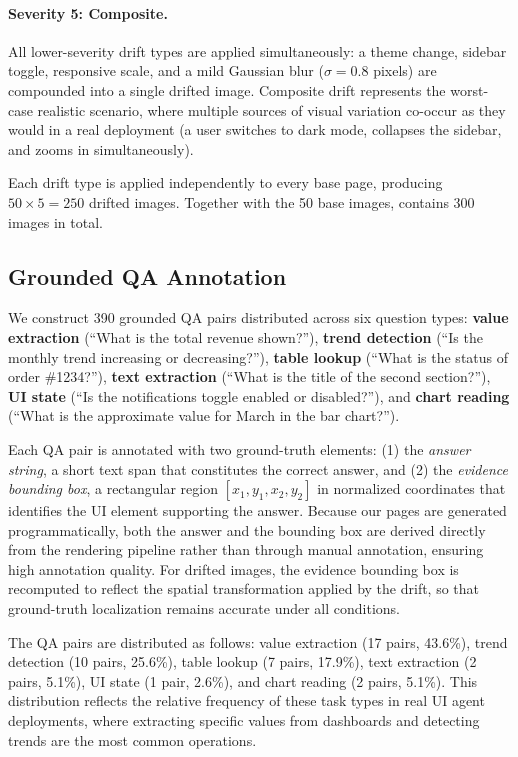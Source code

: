 \paragraph{Severity 5: Composite.}
All lower-severity drift types are applied simultaneously: a theme change, sidebar toggle, responsive scale, and a mild Gaussian blur ($\sigma = 0.8$ pixels) are compounded into a single drifted image. Composite drift represents the worst-case realistic scenario, where multiple sources of visual variation co-occur as they would in a real deployment (a user switches to dark mode, collapses the sidebar, and zooms in simultaneously).

Each drift type is applied independently to every base page, producing $50 \times 5 = 250$ drifted images. Together with the 50 base images, \bench{} contains 300 images in total.

\subsection{Grounded QA Annotation}
\label{sec:method:qa}

We construct 390 grounded QA pairs distributed across six question types: \textbf{value extraction} (``What is the total revenue shown?''), \textbf{trend detection} (``Is the monthly trend increasing or decreasing?''), \textbf{table lookup} (``What is the status of order \#1234?''), \textbf{text extraction} (``What is the title of the second section?''), \textbf{UI state} (``Is the notifications toggle enabled or disabled?''), and \textbf{chart reading} (``What is the approximate value for March in the bar chart?'').

Each QA pair is annotated with two ground-truth elements: (1) the \emph{answer string}, a short text span that constitutes the correct answer, and (2) the \emph{evidence bounding box}, a rectangular region $[x_1, y_1, x_2, y_2]$ in normalized coordinates that identifies the UI element supporting the answer. Because our pages are generated programmatically, both the answer and the bounding box are derived directly from the rendering pipeline rather than through manual annotation, ensuring high annotation quality. For drifted images, the evidence bounding box is recomputed to reflect the spatial transformation applied by the drift, so that ground-truth localization remains accurate under all conditions.

The QA pairs are distributed as follows: value extraction (17 pairs, 43.6\%), trend detection (10 pairs, 25.6\%), table lookup (7 pairs, 17.9\%), text extraction (2 pairs, 5.1\%), UI state (1 pair, 2.6\%), and chart reading (2 pairs, 5.1\%). This distribution reflects the relative frequency of these task types in real UI agent deployments, where extracting specific values from dashboards and detecting trends are the most common operations.

